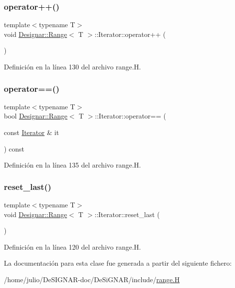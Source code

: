 \subsubsection{\texorpdfstring{operator++()}{operator++()}}
{\footnotesize\ttfamily template$<$typename T$>$ \\
void \hyperlink{class_designar_1_1_range}{Designar\+::\+Range}$<$ T $>$\+::Iterator\+::operator++ (\begin{DoxyParamCaption}{ }\end{DoxyParamCaption})\hspace{0.3cm}{\ttfamily [inline]}}



Definición en la línea 130 del archivo range.\+H.

\mbox{\label{class_designar_1_1_range_1_1_iterator_a0c3ce6ecdc451e8f8f91d114485abb2b}} 
\subsubsection{\texorpdfstring{operator==()}{operator==()}}
{\footnotesize\ttfamily template$<$typename T$>$ \\
bool \hyperlink{class_designar_1_1_range}{Designar\+::\+Range}$<$ T $>$\+::Iterator\+::operator== (\begin{DoxyParamCaption}\item[{const \hyperlink{class_designar_1_1_range_1_1_iterator}{Iterator} \&}]{it }\end{DoxyParamCaption}) const\hspace{0.3cm}{\ttfamily [inline]}}



Definición en la línea 135 del archivo range.\+H.

\mbox{\label{class_designar_1_1_range_1_1_iterator_ae5a8045527f0582b9a0f126ccf50ae19}} 
\subsubsection{\texorpdfstring{reset\+\_\+last()}{reset\_last()}}
{\footnotesize\ttfamily template$<$typename T$>$ \\
void \hyperlink{class_designar_1_1_range}{Designar\+::\+Range}$<$ T $>$\+::Iterator\+::reset\+\_\+last (\begin{DoxyParamCaption}{ }\end{DoxyParamCaption})\hspace{0.3cm}{\ttfamily [inline]}}



Definición en la línea 120 del archivo range.\+H.



La documentación para esta clase fue generada a partir del siguiente fichero\+:\begin{DoxyCompactItemize}
\item 
/home/julio/\+De\+S\+I\+G\+N\+A\+R-\/doc/\+De\+Si\+G\+N\+A\+R/include/\hyperlink{range_8_h}{range.\+H}\end{DoxyCompactItemize}

